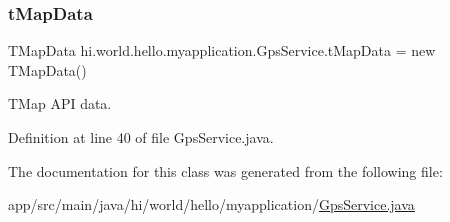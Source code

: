\subsubsection{\texorpdfstring{tMapData}{tMapData}}
{\footnotesize\ttfamily T\+Map\+Data hi.\+world.\+hello.\+myapplication.\+Gps\+Service.\+t\+Map\+Data = new T\+Map\+Data()\hspace{0.3cm}{\ttfamily [private]}}



T\+Map A\+PI data. 



Definition at line 40 of file Gps\+Service.\+java.



The documentation for this class was generated from the following file\+:\begin{DoxyCompactItemize}
\item 
app/src/main/java/hi/world/hello/myapplication/\mbox{\hyperlink{_gps_service_8java}{Gps\+Service.\+java}}\end{DoxyCompactItemize}
